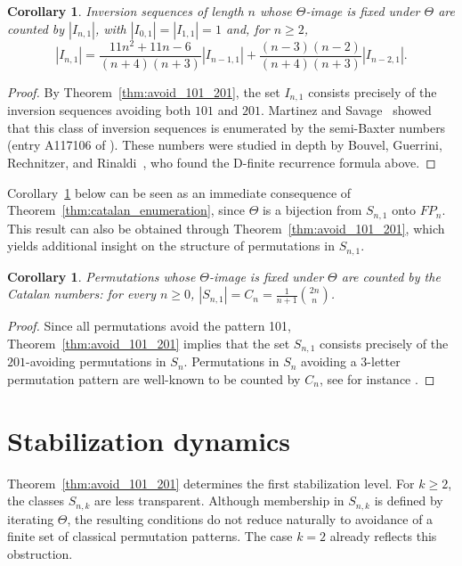 \documentclass[11pt]{article}
\newtheorem{corol}[thm]{Corollary}
\theoremstyle{remark}
\theoremstyle{definition}
\begin{document}
\begin{corol}
Inversion sequences of length $n$ whose $\Theta$-image is fixed under $\Theta$ are counted by $|I_{n,1}|$, with $|I_{0,1}|=|I_{1,1}|=1$ and, for $n\geq2$,
\[
|I_{n,1}|=\frac{11n^2+11n-6}{(n+4)(n+3)}|I_{n-1,1}|+\frac{(n-3)(n-2)}{(n+4)(n+3)}|I_{n-2,1}|.
\]
\end{corol}
\begin{proof}
    By Theorem~\ref{thm:avoid_101_201}, the set $I_{n,1}$ consists precisely of the inversion sequences avoiding both $101$ and $201$. Martinez and Savage~\cite{Martinez_Savage_2018} showed that this class of inversion sequences is enumerated by the semi-Baxter numbers (entry A117106 of \cite{OEIS}). These numbers were studied in depth by Bouvel, Guerrini, Rechnitzer, and Rinaldi~\cite{Bouvel_Guerrini_Rechnitzer_Rinaldi_2018}, who found the D-finite recurrence formula above.
\end{proof}

Corollary~\ref{corol:Catalan_permutations} below can be seen as an immediate consequence of Theorem~\ref{thm:catalan_enumeration}, since $\Theta$ is a bijection from $S_{n,1}$ onto $FP_n$. This result can also be obtained through Theorem~\ref{thm:avoid_101_201}, which yields additional insight on the structure of permutations in $S_{n,1}$.

\begin{corol}\label{corol:Catalan_permutations}
Permutations whose $\Theta$-image is fixed under $\Theta$ are counted by the Catalan numbers: for every $n\geq0$, $|S_{n,1}|=C_n=\frac{1}{n+1}\binom{2n}{n}$.
\end{corol}
\begin{proof}
Since all permutations avoid the pattern 101, Theorem~\ref{thm:avoid_101_201} implies that the set $S_{n,1}$ consists precisely of the $201$-avoiding permutations in $S_n$. Permutations in $S_n$ avoiding a 3-letter permutation pattern are well-known to be counted by $C_n$, see for instance \cite{Simion_Schmidt_1985}. \qedhere
\end{proof}

\section{Stabilization dynamics}

Theorem~\ref{thm:avoid_101_201} determines the first stabilization level. For $k \geq 2$, the classes $S_{n,k}$ are less transparent. Although membership in $S_{n,k}$ is defined by iterating $\Theta$, the resulting conditions do not reduce naturally to avoidance of a finite set of classical permutation patterns. The case $k=2$ already reflects this obstruction.
\end{document}
